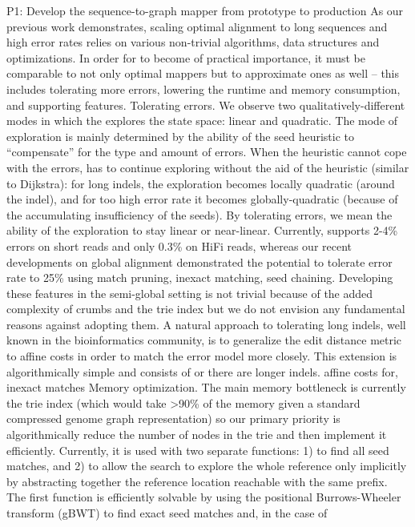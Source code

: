 P1: Develop the \astarix sequence-to-graph mapper from prototype to production As
our previous work demonstrates, scaling optimal \A alignment to long sequences
and high error rates relies on various non-trivial algorithms, data structures
and optimizations. In order for \astarix to become of practical importance, it
must be comparable to not only optimal mappers but to approximate ones as well –
this includes tolerating more errors, lowering the runtime and memory
consumption, and supporting features. Tolerating errors. We observe two
qualitatively-different modes in which the \A explores the state space: linear
and quadratic. The mode of exploration is mainly determined by the ability of
the seed heuristic to “compensate” for the type and amount of errors. When the
heuristic cannot cope with the errors, \A has to continue exploring without the
aid of the heuristic (similar to Dijkstra): for long indels, the exploration
becomes locally quadratic (around the indel), and for too high error rate it
becomes globally-quadratic (because of the accumulating insufficiency of the
seeds). By tolerating errors, we mean the ability of the exploration to stay
linear or near-linear. Currently, \astarix supports 2-4\% errors on short reads
and only 0.3\% on HiFi reads, whereas our recent developments on global
alignment demonstrated the potential to tolerate error rate to 25\% using match
pruning, inexact matching, seed chaining. Developing these features in the
semi-global setting is not trivial because of the added complexity of crumbs and
the trie index but we do not envision any fundamental reasons against adopting
them. A natural approach to tolerating long indels, well known in the
bioinformatics community, is to generalize the edit distance metric to affine
costs in order to match the error model more closely. This extension is
algorithmically simple and consists of or there are longer indels. affine costs
for, inexact matches Memory optimization. The main memory bottleneck is
currently the trie index (which would take >90\% of the memory given a standard
compressed genome graph representation) so our primary priority is
algorithmically reduce the number of nodes in the trie and then implement it
efficiently. Currently, it is used with two separate functions: 1) to find all
seed matches, and 2) to allow the search \A to explore the whole reference only
implicitly by abstracting together the reference location reachable with the
same prefix. The first function is efficiently solvable by using the positional
Burrows-Wheeler transform (gBWT) to find exact seed matches and, in the case of

